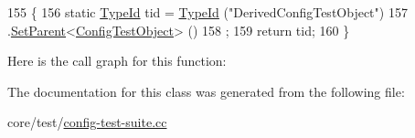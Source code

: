 \begin{DoxyCode}
155 \{
156   \textcolor{keyword}{static} \hyperlink{classns3_1_1TypeId}{TypeId} tid = \hyperlink{classns3_1_1TypeId}{TypeId} (\textcolor{stringliteral}{"DerivedConfigTestObject"})
157     .\hyperlink{classns3_1_1TypeId_abaaca67ab7d2471067e7c275df0f7309}{SetParent}<\hyperlink{classConfigTestObject}{ConfigTestObject}> ()
158     ;
159   \textcolor{keywordflow}{return} tid;
160 \}
\end{DoxyCode}


Here is the call graph for this function\+:




The documentation for this class was generated from the following file\+:\begin{DoxyCompactItemize}
\item 
core/test/\hyperlink{config-test-suite_8cc}{config-\/test-\/suite.\+cc}\end{DoxyCompactItemize}
